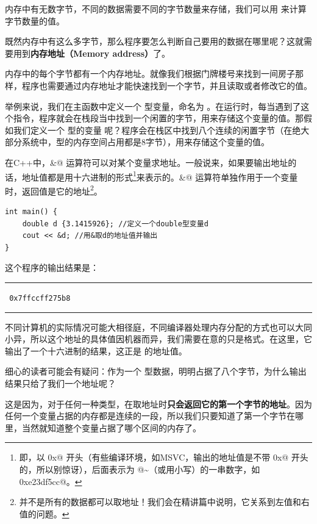 内存中有无数字节，不同的数据需要不同的字节数量来存储，我们可以用 \lstinline@sizeof@ 来计算字节数量的值。\par
既然内存中有这么多字节，那么程序要怎么判断自己要用的数据在哪里呢？这就需要用到\textbf{内存地址（Memory address）}了。\par
内存中的每个字节都有一个内存地址。就像我们根据门牌楼号来找到一间房子那样，程序也需要通过内存地址才能快速找到一个字节，并且读取或者修改它的值。\par
举例来说，我们在主函数中定义一个 \lstinline@char@ 型变量，命名为 \lstinline@ch@。在运行时，每当遇到了这个指令，程序就会在栈段当中找到一个闲置的字节，用来存储这个变量的值。那假如我们定义一个 \lstinline@double@ 型的变量 \lstinline@d@ 呢？程序会在栈区中找到八个连续的闲置字节（在绝大部分系统中，\lstinline@double@ 型的内存空间占用都是8字节），用来存储这个变量的值。\par
在C++中，\lstinline@&@ 运算符可以对某个变量求地址。一般说来，如果要输出地址的话，地址值都是用十六进制的形式\footnote{即，以 \lstinline@0x@ 开头（有些编译环境，如MSVC，输出的地址值是不带 \lstinline@0x@ 开头的，所以别惊讶），后面表示为 @\~{}\lstinline@F@（或用小写）的一串数字，如 \lstinline@0xe23df5cc@。}来表示的。\lstinline@&@ 运算符单独作用于一个变量时，返回值是它的地址\footnote{并不是所有的数据都可以取地址！我们会在精讲篇中说明，它关系到左值和右值的问题。}。
\begin{lstlisting}
int main() {
    double d {3.1415926}; //定义一个double型变量d
    cout << &d; //用&取d的地址值并输出
}
\end{lstlisting}
这个程序的输出结果是：\\\noindent\rule{\linewidth}{0.2pt}\texttt{
0x7ffccff275b8
}\\\noindent\rule{\linewidth}{0.2pt}
不同计算机的实际情况可能大相径庭，不同编译器处理内存分配的方式也可以大同小异，所以这个地址的具体值因机器而异，我们需要在意的只是格式。在这里，它输出了一个十六进制的结果，这正是 \lstinline@d@ 的地址值。\par
细心的读者可能会有疑问：\lstinline@d@ 作为一个 \lstinline@double@ 型数据，明明占据了八个字节，为什么输出结果只给了我们一个地址呢？\par
这是因为，对于任何一种类型，在取地址时\textbf{只会返回它的第一个字节的地址}。因为任何一个变量占据的内存都是连续的一段，所以我们只要知道了第一个字节在哪里，当然就知道整个变量占据了哪个区间的内存了。\par
